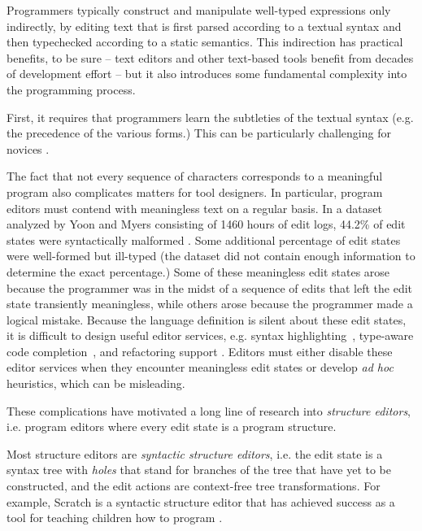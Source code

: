 
Programmers typically construct and manipulate well-typed expressions only
indirectly, by editing text that is first parsed according to a textual
syntax and then typechecked according to a static semantics. This
indirection has practical benefits, to be sure -- text editors and other
text-based tools benefit from decades of development effort -- but it also
introduces some fundamental complexity into the programming process.

First, it requires that programmers learn the subtleties of the textual
syntax (e.g. the precedence of the various forms.) This can be particularly
challenging for novices \cite{Altadmri:2015:MCI:2676723.2677258}.

The fact that not every sequence of characters corresponds to a meaningful
program also complicates matters for tool designers. In particular, program
editors must contend with meaningless text on a regular basis. In a dataset
analyzed by Yoon and Myers consisting of 1460 hours of edit logs, 44.2\% of
edit states were syntactically malformed \cite{6883030}. Some additional
percentage of edit states were well-formed but ill-typed (the dataset did
not contain enough information to determine the exact percentage.)  Some of
these meaningless edit states arose because the programmer was in the midst
of a sequence of edits that left the edit state transiently meaningless,
while others arose because the programmer made a logical mistake. Because
the language definition is silent about these edit states, it is difficult
to design useful editor services, e.g. syntax
highlighting~\cite{sarkar2015impact}, type-aware code
completion~\cite{Mooty:2010:CCC:1915084.1916348,Omar:2012:ACC:2337223.2337324},
and refactoring support \cite{mens2004survey}. Editors must either disable
these editor services when they encounter meaningless edit states or
develop \emph{ad hoc} heuristics, which can be misleading.

These complications have motivated a long line of research
into \emph{structure editors}, i.e. program editors where every edit state
is a program structure.

Most structure editors are \emph{syntactic structure editors}, i.e. the
edit state is a syntax tree with \emph{holes} that stand for branches of
the tree that have yet to be constructed, and the edit actions are
context-free tree transformations. For example, Scratch is a syntactic
structure editor that has achieved success as a tool for teaching children
how to program \cite{Resnick:2009:SP:1592761.1592779}.

